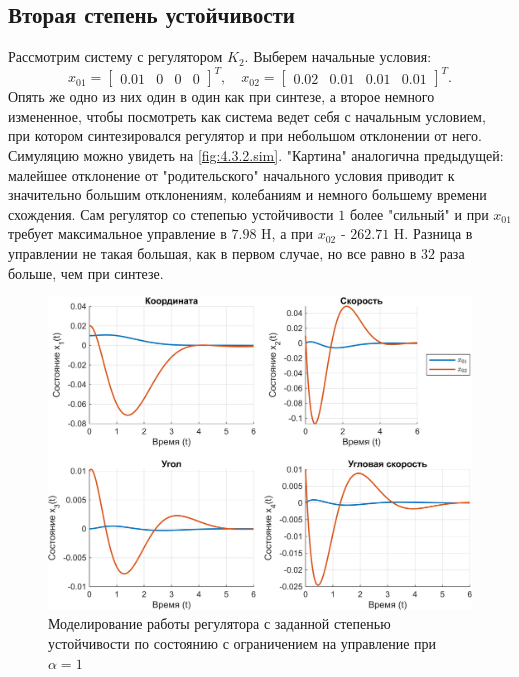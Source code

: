 \subsection{Вторая степень устойчивости}

Рассмотрим систему с регулятором $K_2$. Выберем начальные условия:
\begin{equation*}
    x_{01}=\begin{bmatrix}
        0.01&0&0&0
    \end{bmatrix}^T,\quad
    x_{02}=\begin{bmatrix}
        0.02&0.01&0.01&0.01
    \end{bmatrix}^T.
\end{equation*}
Опять же одно из них один в один как при синтезе, а второе немного измененное, чтобы
посмотреть как система ведет себя с начальным условием, при котором синтезировался
регулятор и при небольшом отклонении от него.
Симуляцию можно увидеть на \autoref{fig:4.3.2.sim}. 
"Картина" аналогична предыдущей: малейшее отклонение от "родительского" 
начального условия приводит к значительно большим отклонениям, колебаниям и
немного большему времени схождения. Сам регулятор со степепью устойчивости
$1$ более "сильный" и при $x_{01}$ требует максимальное управление в $7.98$ H, 
а при $x_{02}$ - $262.71$ H. Разница в управлении не такая большая, как в
первом случае, но все равно в $32$ раза больше, чем при синтезе.

\begin{figure}[H]
    \centering
    \includegraphics[width=\linewidth]{figs/4.3.2.sim.png}
    \caption{Моделирование работы регулятора с заданной степенью устойчивости
    по состоянию с ограничением на управление при $\alpha=1$}
    \label{fig:4.3.2.sim}
\end{figure}

